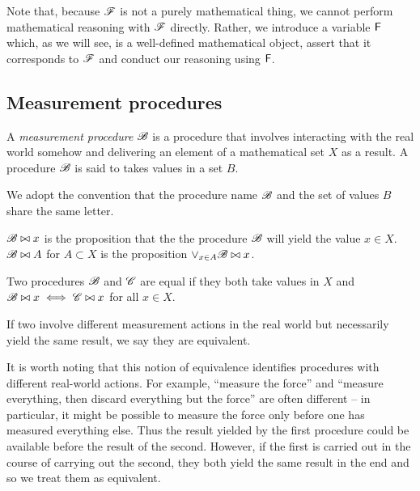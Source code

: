 Note that, because $\mathscr{F}$ is not a purely mathematical thing, we cannot perform mathematical reasoning with $\mathscr{F}$ directly. Rather, we introduce a variable $\mathsf{F}$ which, as we will see, is a well-defined mathematical object, assert that it corresponds to $\mathscr{F}$ and conduct our reasoning using $\mathsf{F}$.

\subsection{Measurement procedures}\label{sec:mprocs}

\begin{definition}
A \emph{measurement procedure} $\mathscr{B}$ is a procedure that involves interacting with the real world somehow and delivering an element of a mathematical set $X$ as a result. A procedure $\mathscr{B}$ is said to takes values in a set $B$.
\end{definition}

We adopt the convention that the procedure name $\mathscr{B}$ and the set of values $B$ share the same letter.

\begin{definition}
$\mathscr{B}\bowtie x$ is the proposition that the the procedure $\mathscr{B}$ will yield the value $x\in X$. $\mathscr{B}\bowtie A$ for $A\subset X$ is the proposition $\lor_{x\in A} \mathscr{B}\bowtie x$.
\end{definition}

\begin{definition}\label{def:equality}
Two procedures $\mathscr{B}$ and $\mathscr{C}$ are equal if they both take values in $X$ and $\mathscr{B}\bowtie x\iff \mathscr{C}\bowtie x$ for all $x\in X$.
\end{definition}

If two involve different measurement actions in the real world but necessarily yield the same result, we say they are equivalent.

It is worth noting that this notion of equivalence identifies procedures with different real-world actions. For example, ``measure the force'' and ``measure everything, then discard everything but the force'' are often different -- in particular, it might be possible to measure the force only before one has measured everything else. Thus the result yielded by the first procedure could be available before the result of the second. However, if the first is carried out in the course of carrying out the second, they both yield the same result in the end and so we treat them as equivalent. 

